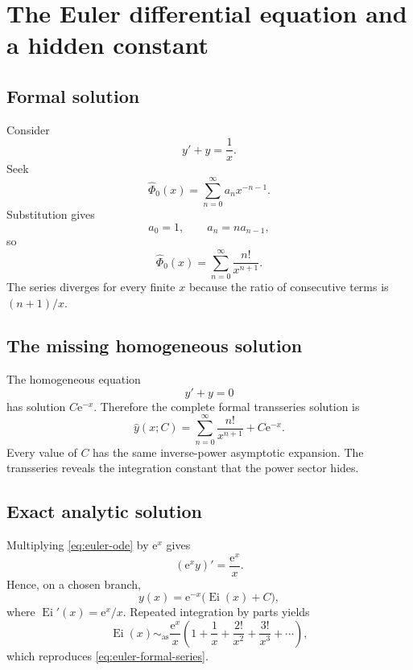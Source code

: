 \documentclass[11pt,oneside]{book}
\theoremstyle{definition}
\theoremstyle{remark}
\newcommand{\Ei}{\operatorname{Ei}}
\newcommand{\asympseries}{\sim_{\!\mathrm{as}}}
\newcommand{\e}{\mathrm{e}}
\newcommand{\phihat}{\widehat{\Phi}}
\begin{document}
\chapter{The Euler differential equation and a hidden constant}
\label{ch:euler-ode}

\section{Formal solution}

Consider
\begin{equation}
  y'+y=\frac1x.
  \label{eq:euler-ode}
\end{equation}
Seek
\[
  \phihat_0(x)=\sum_{n=0}^{\infty}a_nx^{-n-1}.
\]
Substitution gives
\[
  a_0=1,
  \qquad a_n=na_{n-1},
\]
so
\begin{equation}
  \phihat_0(x)=
  \sum_{n=0}^{\infty}\frac{n!}{x^{n+1}}.
  \label{eq:euler-formal-series}
\end{equation}
The series diverges for every finite $x$ because the ratio of consecutive terms
is $(n+1)/x$.

\section{The missing homogeneous solution}

The homogeneous equation
\[
  y'+y=0
\]
has solution $C\e^{-x}$. Therefore the complete formal transseries solution is
\begin{equation}
  \widehat y(x;C)=
  \sum_{n=0}^{\infty}\frac{n!}{x^{n+1}}+C\e^{-x}.
  \label{eq:euler-complete-transseries}
\end{equation}
Every value of $C$ has the same inverse-power asymptotic expansion. The
transseries reveals the integration constant that the power sector hides.

\section{Exact analytic solution}

Multiplying \eqref{eq:euler-ode} by $\e^x$ gives
\[
  (\e^xy)'=\frac{\e^x}{x}.
\]
Hence, on a chosen branch,
\begin{equation}
  y(x)=\e^{-x}\bigl(\Ei(x)+C\bigr),
  \label{eq:euler-exact-solution}
\end{equation}
where $\Ei'(x)=\e^x/x$. Repeated integration by parts yields
\[
  \Ei(x)\asympseries
  \frac{\e^x}{x}
  \left(1+\frac1x+\frac{2!}{x^2}
  +\frac{3!}{x^3}+\cdots\right),
\]
which reproduces \eqref{eq:euler-formal-series}.
\end{document}
